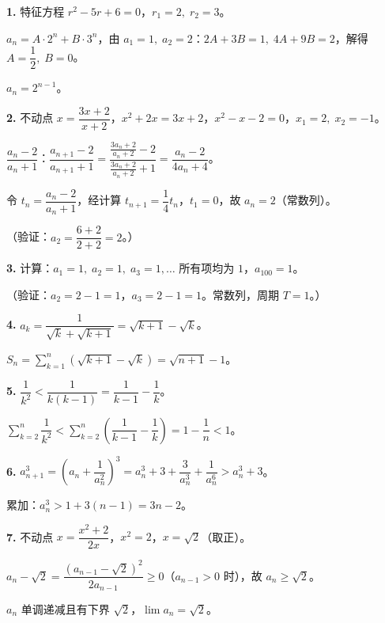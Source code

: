 \documentclass[12pt, a4paper]{ctexart}
\begin{document}
\begin{knowledgebox}[参考答案]
\textbf{1.} 特征方程 $r^2 - 5r + 6 = 0$，$r_1 = 2,\;r_2 = 3$。

$a_n = A\cdot 2^n + B\cdot 3^n$，由 $a_1=1,\;a_2=2$：$2A+3B=1,\;4A+9B=2$，解得 $A = \dfrac{1}{2},\;B = 0$。

$a_n = 2^{n-1}$。

\vspace{6pt}
\textbf{2.} 不动点 $x = \dfrac{3x+2}{x+2}$，$x^2+2x=3x+2$，$x^2-x-2=0$，$x_1=2,\;x_2=-1$。

$\dfrac{a_n-2}{a_n+1}$：$\dfrac{a_{n+1}-2}{a_{n+1}+1} = \dfrac{\frac{3a_n+2}{a_n+2}-2}{\frac{3a_n+2}{a_n+2}+1} = \dfrac{a_n-2}{4a_n+4}$。

令 $t_n = \dfrac{a_n-2}{a_n+1}$，经计算 $t_{n+1} = \dfrac{1}{4}t_n$，$t_1 = 0$，故 $a_n = 2$（常数列）。

（验证：$a_2 = \dfrac{6+2}{2+2} = 2$。\;\checkmark）

\vspace{6pt}
\textbf{3.} 计算：$a_1=1,\;a_2=1,\;a_3=1,\ldots$ 所有项均为 $1$，$a_{100}=1$。

（验证：$a_2 = 2-1 = 1$，$a_3 = 2-1 = 1$。常数列，周期 $T=1$。）

\vspace{6pt}
\textbf{4.} $a_k = \dfrac{1}{\sqrt{k}+\sqrt{k+1}} = \sqrt{k+1}-\sqrt{k}$。

$S_n = \displaystyle\sum_{k=1}^{n}(\sqrt{k+1}-\sqrt{k}) = \sqrt{n+1}-1$。

\vspace{6pt}
\textbf{5.} $\dfrac{1}{k^2} < \dfrac{1}{k(k-1)} = \dfrac{1}{k-1}-\dfrac{1}{k}$。

$\displaystyle\sum_{k=2}^{n}\dfrac{1}{k^2} < \sum_{k=2}^{n}\left(\dfrac{1}{k-1}-\dfrac{1}{k}\right) = 1-\dfrac{1}{n} < 1$。\;\checkmark

\vspace{6pt}
\textbf{6.} $a_{n+1}^3 = \left(a_n+\dfrac{1}{a_n^2}\right)^3 = a_n^3 + 3 + \dfrac{3}{a_n^3} + \dfrac{1}{a_n^6} > a_n^3 + 3$。

累加：$a_n^3 > 1 + 3(n-1) = 3n-2$。\;\checkmark

\vspace{6pt}
\textbf{7.} 不动点 $x = \dfrac{x^2+2}{2x}$，$x^2=2$，$x=\sqrt{2}$（取正）。

$a_n - \sqrt{2} = \dfrac{(a_{n-1}-\sqrt{2})^2}{2a_{n-1}} \geq 0$（$a_{n-1}>0$ 时），故 $a_n \geq \sqrt{2}$。

$a_n$ 单调递减且有下界 $\sqrt{2}$，$\lim a_n = \sqrt{2}$。


\end{knowledgebox}
\end{document}
